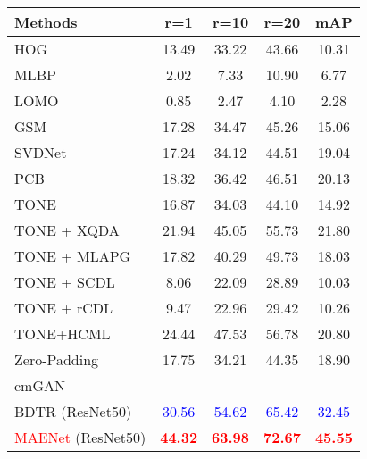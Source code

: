 \begin{table}[!htpb]
  \centering
  \begin{tabular}{cccccc}
     \\ \hline
  \multicolumn{2}{l|}{Methods} & r=1 &r=10 & r=20 & mAP   \\\hline
  
  \multicolumn{2}{l|}{HOG} & 13.49 & 33.22 & 43.66 & 10.31  \\
  \multicolumn{2}{l|}{MLBP} &  2.02& 7.33 & 10.90 & 6.77  \\
  \multicolumn{2}{l|}{LOMO\cite{liao2015person}} &  0.85& 2.47 & 4.10 & 2.28  \\
  \multicolumn{2}{l|}{GSM\cite{lin2016cross}} &  17.28& 34.47 & 45.26 & 15.06  \\

  \hline
  \hline
  \multicolumn{2}{l|}{SVDNet\cite{sun2017svdnet}} &  17.24& 34.12 & 44.51 & 19.04  \\
  \multicolumn{2}{l|}{PCB\cite{sun2018beyond}} & 18.32& 36.42 & 46.51& 20.13   \\ 
  \hline
  \hline
  \multicolumn{2}{l|}{TONE\cite{ye2018hierarchical}} &  16.87& 34.03 & 44.10 & 14.92  \\
  \multicolumn{2}{l|}{TONE + XQDA} &  21.94 & 45.05 & 55.73 & 21.80  \\
  \multicolumn{2}{l|}{TONE + MLAPG} &  17.82 & 40.29 & 49.73 & 18.03  \\
  \multicolumn{2}{l|}{TONE + SCDL} &  8.06 & 22.09 & 28.89 & 10.03  \\
  \multicolumn{2}{l|}{TONE + rCDL} &  9.47 & 22.96 & 29.42 & 10.26  \\
  \multicolumn{2}{l|}{TONE+HCML }& 24.44 & 47.53 & 56.78 & 20.80 \\
  \multicolumn{2}{l|}{Zero-Padding\cite{wu2017rgb} }& 17.75 &34.21 & 44.35 & 18.90  \\
  \multicolumn{2}{l|}{cmGAN\cite{dai2018cross} }& - & - & - & -  \\
  \multicolumn{2}{l|}{BDTR (ResNet50)\cite{ye2018visible} }& \textcolor{blue}{30.56} & \textcolor{blue}{54.62} & \textcolor{blue}{65.42} & \textcolor{blue}{32.45}  \\
  \hline
  \hline
   \multicolumn{2}{l|}{\textcolor{red}{MAENet} (ResNet50) }&\textcolor{red}{\textbf{44.32}} & \textcolor{red}{\textbf{63.98}} & \textcolor{red}{\textbf{72.67}} & \textcolor{red}{\textbf{45.55}} \\
   \hline
   \hline
  \end{tabular}
  \label{table:visiblethermalRegdb}
\end{table}
